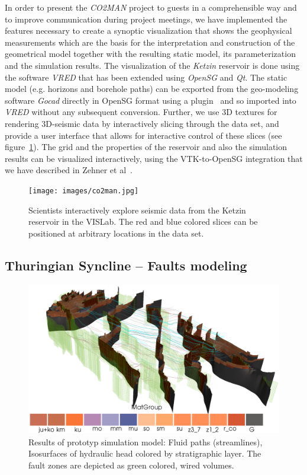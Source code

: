 \documentclass[twocolumn]{svjour3}          %
\begin{document}
In order to present the \emph{CO2MAN} project to guests in a comprehensible way and to improve communication during project meetings, we have implemented the features necessary to create a synoptic visualization that shows the geophysical measurements which are the basis for the interpretation and construction of the geometrical model together with the resulting static model, its parameterization and the simulation results. The visualization of the \emph{Ketzin} reservoir is done using the software \emph{VRED} that has been extended using \emph{OpenSG} and \emph{Qt}. The static model (e.g. horizons and borehole paths) can be exported from the geo-modeling software \emph{Gocad} directly in OpenSG format using a plugin~\cite{zehner:gocad} and so imported into \emph{VRED} without any subsequent conversion. Further, we use 3D textures for rendering 3D-seismic data by interactively slicing through the data set, and provide a user interface that allows for interactive control of these slices (see figure~\ref{fig:co2man}). The grid and the properties of the reservoir and also the simulation results can be visualized interactively, using the VTK-to-OpenSG integration that we have described in Zehner et al~\cite{zehner:uncertainty}.

\begin{figure}[htb]
  \texttt{[image: images/co2man.jpg]}
\caption{Scientists interactively explore seismic data from the Ketzin reservoir in the VISLab. The red and blue colored slices can be positioned at arbitrary locations in the data set.}
\label{fig:co2man}
\end{figure}

\subsection{Thuringian Syncline -- Faults modeling}
\label{thuringian-syncline---faults}

\begin{figure}[htb]
  \includegraphics[width=\linewidth]{images/ThuringianSyncline.png}
\caption{Results of prototyp simulation model: Fluid paths (streamlines),
Isosurfaces of hydraulic head colored by stratigraphic layer. The fault zones
are depicted as green colored, wired volumes.}
\label{fig:ThuringianSyncline}
\end{figure}
\end{document}
